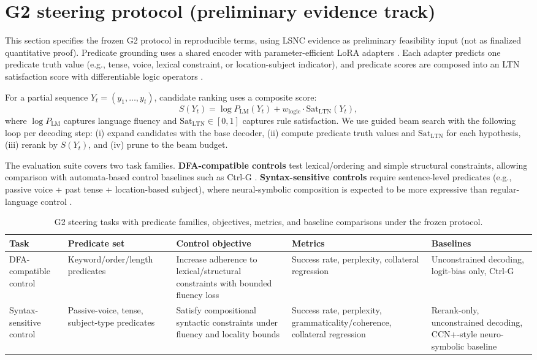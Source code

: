 \documentclass[../ppgc-tese.tex]{subfiles}
\begin{document}
\section{G2 steering protocol (preliminary evidence track)}
\label{sec:g2-steering-protocol}
This section specifies the frozen G2 protocol in reproducible terms, using LSNC evidence as preliminary feasibility input (not as finalized quantitative proof). Predicate grounding uses a shared encoder with parameter-efficient LoRA adapters \cite{hu2022lora,sanh2019distilbert}. Each adapter predicts one predicate truth value (e.g., tense, voice, lexical constraint, or location-subject indicator), and predicate scores are composed into an LTN satisfaction score with differentiable logic operators \cite{badreddine2022ltn}.

For a partial sequence $Y_t=(y_1,\dots,y_t)$, candidate ranking uses a composite score:
\[
S(Y_t)=\log P_{\mathrm{LM}}(Y_t) + w_{\mathrm{logic}}\cdot \mathrm{Sat}_{\mathrm{LTN}}(Y_t),
\]
where $\log P_{\mathrm{LM}}$ captures language fluency and $\mathrm{Sat}_{\mathrm{LTN}}\in[0,1]$ captures rule satisfaction. We use guided beam search with the following loop per decoding step: (i) expand candidates with the base decoder, (ii) compute predicate truth values and $\mathrm{Sat}_{\mathrm{LTN}}$ for each hypothesis, (iii) rerank by $S(Y_t)$, and (iv) prune to the beam budget.

The evaluation suite covers two task families. \textbf{DFA-compatible controls} test lexical/ordering and simple structural constraints, allowing comparison with automata-based control baselines such as Ctrl-G \cite{zhang2024ctrlg}. \textbf{Syntax-sensitive controls} require sentence-level predicates (e.g., passive voice + past tense + location-based subject), where neural-symbolic composition is expected to be more expressive than regular-language control \cite{giunchiglia2024ccnplus}.

\begin{table}[ht]
\centering
\small
\begin{tabular}{p{}p{}p{}p{}p{}}
\hline
\textbf{Task} & \textbf{Predicate set} & \textbf{Control objective} & \textbf{Metrics} & \textbf{Baselines} \\
\hline
DFA-compatible control &
Keyword/order/length predicates &
Increase adherence to lexical/structural constraints with bounded fluency loss &
Success rate, perplexity, collateral regression &
Unconstrained decoding, logit-bias only, Ctrl-G \\

Syntax-sensitive control &
Passive-voice, tense, subject-type predicates &
Satisfy compositional syntactic constraints under fluency and locality bounds &
Success rate, perplexity, grammaticality/coherence, collateral regression &
Rerank-only, unconstrained decoding, CCN+-style neuro-symbolic baseline \\
\hline
\end{tabular}
\caption{G2 steering tasks with predicate families, objectives, metrics, and baseline comparisons under the frozen protocol.}
\label{tab:g2-task-predicate-metric}
\end{table}
\end{document}
